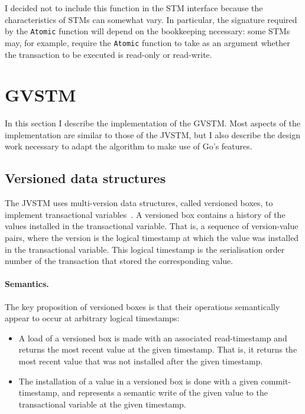 \documentclass[12pt,a4paper,oneside,openright]{report}
\newcommand{\goFunc}[1]{\texttt{#1}}
\begin{document}
I decided not to include this function in the STM interface because
the characteristics of STMs can somewhat vary. In particular, the
signature required by the \goFunc{Atomic} function will depend on the
bookkeeping necessary: some STMs may, for example, require the
\goFunc{Atomic} function to take as an argument whether the
transaction to be executed is read-only or read-write.

\section{GVSTM}
\label{sec:impl:gvstm}

In this section I describe the implementation of the GVSTM. Most
aspects of the implementation are similar to those of the JVSTM, but I
also describe the design work necessary to adapt the algorithm to make
use of Go's features.

\subsection{Versioned data structures}
\label{sec:impl:vers-data-struct}

The JVSTM uses multi-version data structures, called versioned boxes,
to implement transactional variables~\cite{VBox}. A versioned box
contains a history of the values installed in the transactional
variable. That is, a sequence of version-value pairs, where the
version is the logical timestamp at which the value was installed in
the transactional variable. This logical timestamp is the
serialisation order number of the transaction that stored the
corresponding value.

\paragraph{Semantics.} The key proposition of versioned boxes is that
their operations semantically appear to occur at arbitrary logical
timestamps:
\begin{itemize}
\item A load of a versioned box is made with an associated
  read-timestamp and returns the most recent value at the given
  timestamp. That is, it returns the most recent value that was not
  installed after the given timestamp.
\item The installation of a value in a versioned box is done with a
  given commit-timestamp, and represents a semantic write of the given
  value to the transactional variable at the given timestamp.
\end{itemize}
\end{document}

